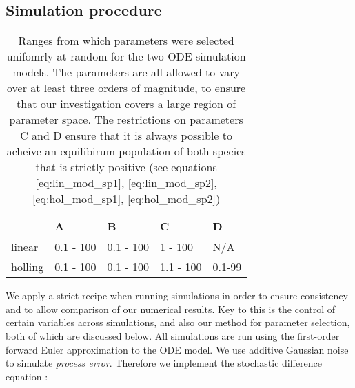 

\subsection{Simulation procedure}
\label{sec:simulation_method}

\begin{center}
\begin{table}
\centering
    \begin{tabular}{| l | l | l | l | l |}

    \hline
     & A & B & C & D\\ \hline
    linear & 0.1 - 100 & 0.1 - 100 & 1 - 100 & N/A \\ \hline
    holling & 0.1 - 100 & 0.1 - 100 & 1.1 - 100 & 0.1-99 \\
    \hline
    \end{tabular}
\caption{Ranges from which parameters were selected unifomrly at random for the two ODE simulation models. The parameters are all allowed to vary over at least three orders of magnitude, to ensure that our investigation covers a large region of parameter space. The restrictions on parameters C and D ensure that it is always possible to acheive an equilibirum population of both species that is strictly positive (see equations \ref{eq:lin_mod_sp1}, \ref{eq:lin_mod_sp2}, \ref{eq:hol_mod_sp1}, \ref{eq:hol_mod_sp2})}
\label{table:p_range}    
\end{table}
\end{center}


We apply a strict recipe when running simulations in order to ensure consistency and to allow comparison of our numerical results. Key to this is the control of certain variables across simulations, and also our method for parameter selection, both of which are discussed below. All simulations are run using the first-order forward Euler approximation to the ODE model. We use additive Gaussian noise to simulate \emph{process error}. Therefore we implement the stochastic difference equation :

